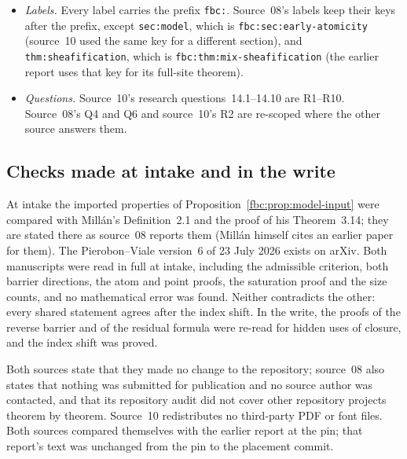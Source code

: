 \documentclass[11pt,letterpaper]{article}
\theoremstyle{definition}
\theoremstyle{remark}
\newcommand{\om}{\omega}
\newcommand{\C}{\mathbb C}
\begin{document}
\begin{itemize}
the mixing section is written out (a bare $\C$ is source~10's $\C_\om$).
Source~10's renamed symbols are listed in Section~\ref{fbc:sec:notation}.
No normalization changed.
\item \emph{Labels.} Every label carries the prefix \texttt{fbc:}.
Source~08's labels keep their keys after the prefix, except
\texttt{sec:model}, which is \texttt{fbc:sec:early-atomicity} (source~10
used the same key for a different section), and
\texttt{thm:sheafification}, which is
\texttt{fbc:thm:mix-sheafification} (the earlier report uses that key for
its full-site theorem).
\item \emph{Questions.} Source~10's research questions~14.1--14.10 are
R1--R10. Source~08's Q4 and Q6 and source~10's R2 are re-scoped where the
other source answers them.
\end{itemize}

\subsection{Checks made at intake and in the write}
At intake the imported properties of
Proposition~\ref{fbc:prop:model-input} were compared with Mill\'an's
Definition~2.1 and the proof of his Theorem~3.14; they are stated there
as source~08 reports them (Mill\'an himself cites an earlier paper for
them). The Pierobon--Viale version~6 of 23 July 2026 exists on arXiv.
Both manuscripts were read in full at intake, including the admissible
criterion, both barrier directions, the atom and point proofs, the
saturation proof and the size counts, and no mathematical error was
found. Neither contradicts the other: every shared statement agrees after
the index shift. In the write, the proofs of the reverse barrier and of
the residual formula were re-read for hidden uses of closure, and the
index shift was proved.

Both sources state that they made no change to the repository; source~08
also states that nothing was submitted for publication and no source
author was contacted, and that its repository audit did not cover other
repository projects theorem by theorem. Source~10 redistributes no
third-party PDF or font files. Both sources compared themselves with the
earlier report at the pin; that report's text was unchanged from the pin
to the placement commit.
\end{document}

